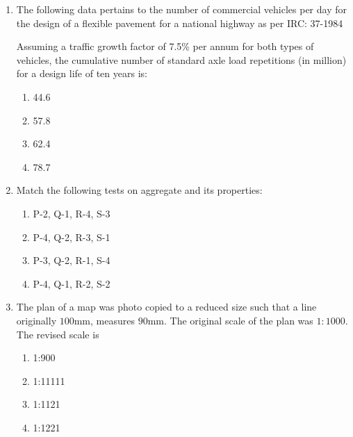 \documentclass[journal]{IEEEtran}
\begin{document}
\begin{enumerate}
{        }
    \item{
	
			The following data pertains to the number of commercial vehicles per day for the design of a flexible pavement for a national highway as per IRC: 37-1984 
			
			
			
			Assuming a traffic growth factor of 7.5\% per annum for both types of vehicles, the cumulative number of standard axle load repetitions (in million) for a design life of ten years is:
			\text{   }\hfill
			
			\begin{multicols}{4}
				\begin{enumerate}
					\item 44.6
					\item 57.8
					\item 62.4
					\item 78.7
				\end{enumerate}
			\end{multicols}
			
		}
    \item{
	
			Match the following tests on aggregate and its properties:
			
			\text{   }\hfill
			
			\begin{multicols}{2}
				\begin{enumerate}
					\item  P-2, Q-1, R-4, S-3  
					
					\item  P-4, Q-2, R-3, S-1  
					 
					\item  P-3, Q-2, R-1, S-4  
					
					\item  P-4, Q-1, R-2, S-2  
				\end{enumerate}
			\end{multicols}
			
		}
    \item{
        
           The plan of a map was photo copied to a reduced size such that a line originally $100$mm, measures $90$mm. The original scale of the plan was $1:1000$. The revised scale is 
             \hfill
              
              \begin{multicols}{4}
              	\begin{enumerate}
              		\item 1:900
              		\item 1:11111
              		\item 1:1121
              		\item 1:1221
              	\end{enumerate}
              \end{multicols}
        
}
\end{enumerate}
\end{document}
